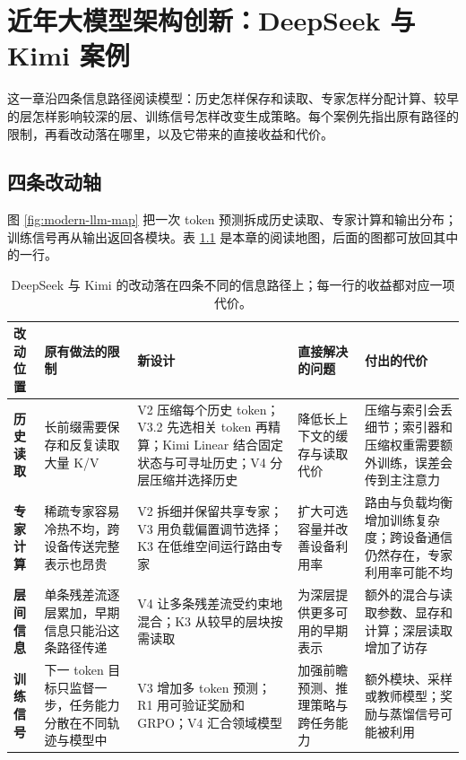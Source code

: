 \chapter{近年大模型架构创新：DeepSeek 与 Kimi 案例}
\label{chap:modern-arch}

\begin{keybox}[先看哪里变了]
这一章沿四条信息路径阅读模型：历史怎样保存和读取、专家怎样分配计算、较早的层怎样影响较深的层、训练信号怎样改变生成策略。每个案例先指出原有路径的限制，再看改动落在哪里，以及它带来的直接收益和代价。
\end{keybox}

\section{四条改动轴}

图 \ref{fig:modern-llm-map} 把一次 token 预测拆成历史读取、专家计算和输出分布；训练信号再从输出返回各模块。表 \ref{tab:architecture-innovations} 是本章的阅读地图，后面的图都可放回其中的一行。

\begin{table}[ht]
\centering\scriptsize
\begin{tabularx}{\textwidth}{>{\bfseries}p{15mm} p{28mm} X p{27mm} p{29mm}}
\toprule
改动位置 & 原有做法的限制 & 新设计 & 直接解决的问题 & 付出的代价\\
\midrule
历史读取 & 长前缀需要保存和反复读取大量 K/V & V2 压缩每个历史 token；V3.2 先选相关 token 再精算；Kimi Linear 结合固定状态与可寻址历史；V4 分层压缩并选择历史 & 降低长上下文的缓存与读取代价 & 压缩与索引会丢细节；索引器和压缩权重需要额外训练，误差会传到主注意力\\
专家计算 & 稀疏专家容易冷热不均，跨设备传送完整表示也昂贵 & V2 拆细并保留共享专家；V3 用负载偏置调节选择；K3 在低维空间运行路由专家 & 扩大可选容量并改善设备利用率 & 路由与负载均衡增加训练复杂度；跨设备通信仍然存在，专家利用率可能不均\\
层间信息 & 单条残差流逐层累加，早期信息只能沿这条路径传递 & V4 让多条残差流受约束地混合；K3 从较早的层块按需读取 & 为深层提供更多可用的早期表示 & 额外的混合与读取参数、显存和计算；深层读取增加了访存\\
训练信号 & 下一 token 目标只监督一步，任务能力分散在不同轨迹与模型中 & V3 增加多 token 预测；R1 用可验证奖励和 GRPO；V4 汇合领域模型 & 加强前瞻预测、推理策略与跨任务能力 & 额外模块、采样或教师模型；奖励与蒸馏信号可能被利用\\
\bottomrule
\end{tabularx}
\caption{DeepSeek 与 Kimi 的改动落在四条不同的信息路径上；每一行的收益都对应一项代价。}
\label{tab:architecture-innovations}
\end{table}

